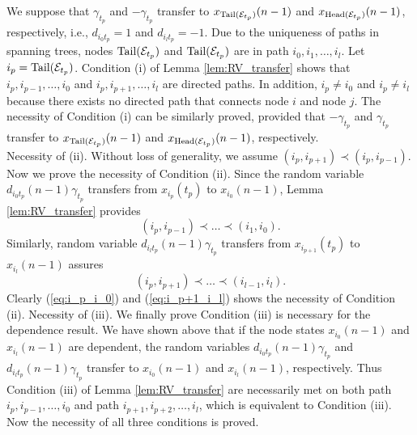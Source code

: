 \documentclass[a4paper, 11pt]{article}
\newcommand{\1}{\mathbf{1}}
\newcommand{\asf}{\mathcal{E}}
\newcommand{\Head}{\textnormal{Head}}
\newcommand{\Tail}{\textnormal{Tail}}
\newcommand{\gammab}{{\bm \gamma}}
\begin{document}
We suppose that $\gamma_{t_p}$ and $-\gamma_{t_p}$ transfer to $x_{\Tail(\asf_{t_p})}(n-1 )$ and $x_{\Head(\asf_{t_p})}(n-1 )$, respectively, i.e., $d_{i_0 t_p}=1$ and $d_{i_l t_p}=-1$. Due to the uniqueness of paths in spanning trees, nodes $\Tail(\asf_{t_p})$ and $\Tail(\asf_{t_p})$ are in path $i_0,i_1,\dots,i_l$. Let $i_p=\Tail(\asf_{t_p})$. Condition (i) of Lemma \ref{lem:RV_transfer} shows that $i_p,i_{p-1},\dots,i_0$ and $i_p,i_{p+1},\dots,i_l$ are directed paths. In addition, $i_p\neq i_0$ and $i_p\neq i_l$ because there exists no directed path that connects node $i$ and node $j$. The necessity of Condition (i) can be similarly proved, provided that $-\gamma_{t_p}$ and $\gamma_{t_p}$ transfer to $x_{\Tail(\asf_{t_p})}(n-1 )$ and $x_{\Head(\asf_{t_p})}(n-1 )$, respectively.\\
Necessity of (ii). Without loss of generality, we assume $(i_p,i_{p+1})\prec(i_p,i_{p-1})$. Now we prove the necessity of Condition (ii). Since the random variable $d_{i_0 t_p}(n-1 )\gamma_{t_p}$ transfers from $x_{i_p}(t_p)$ to $x_{i_0}(n-1 )$, Lemma \ref{lem:RV_transfer} provides
\begin{equation}\label{eq:i_p_i_0}
(i_p,i_{p-1})\prec\dots\prec(i_1,i_0).
\end{equation}
Similarly, random variable $d_{i_l t_p}(n-1 )\gamma_{t_p}$ transfers from $x_{i_{p+1}}(t_p)$ to $x_{i_l}(n-1 )$ assures
\begin{equation}\label{eq:i_p+1_i_l}
(i_p,i_{p+1})\prec\dots\prec(i_{l-1},i_l).
\end{equation}
Clearly (\ref{eq:i_p_i_0}) and (\ref{eq:i_p+1_i_l}) shows the necessity of Condition (ii).
Necessity of (iii). We finally prove Condition (iii) is necessary for the dependence result. We have shown above that if the node states $x_{i_0}(n-1 )$ and $x_{i_l}(n-1 )$ are dependent, the random variables $d_{i_0 t_p}(n-1 )\gamma_{t_p}$ and $d_{i_l t_p}(n-1 )\gamma_{t_p}$ transfer to $x_{i_0}(n-1 )$ and $x_{i_l}(n-1 )$, respectively. Thus Condition (iii) of Lemma \ref{lem:RV_transfer} are necessarily met on both path $i_p,i_{p-1},\dots,i_0$ and path $i_{p+1},i_{p+2},\dots,i_l$, which is equivalent to Condition (iii). Now the necessity of all three conditions is proved.
\end{document}
